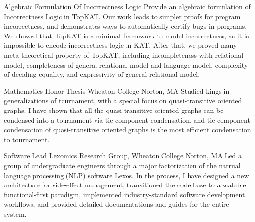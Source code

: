 \documentclass[10pt]{moderncv}        %
\let\oldsection=\section
\renewcommand{\section}{%
  \needspace{\baselineskip}
  \oldsection
}
\begin{document}
{Algebraic Formulation Of Incorrectness Logic}
{}{}{}
{Provide an algebraic formulation of Incorrectness Logic in TopKAT.
Our work leads to simpler proofs for program incorrectness, 
and demonstrates ways to automatically certify bugs in programs.
We showed that TopKAT is a minimal framework to model incorrectness,
as it is impossible to encode incorrectness logic in KAT.
After that, we proved many meta-theoretical property of TopKAT,
including incompleteness with relational model, 
completeness of general relational model and language model, 
complexity of deciding equality, and expressivity of general relational model.
}

{Mathematics Honor Thesis}
{Wheaton College} {Norton, MA}{}
{Studied kings in generalizations of tournament,
with a special focus on quasi-transitive oriented graphs.
I have shown that all the quasi-transitive oriented graphs
can be condensed into a tournament via tie component condensation, 
and tie component condensation of quasi-transitive 
oriented graphs is the most efficient condensation to tournament.
}

{Software Lead}
{Lexomics Research Group, Wheaton College}
{Norton, MA}{}
{
  Led a group of undergraduate engineers through a major factorization of 
  the natrual language processing (NLP) software 
  \href{https://github.com/WheatonCS/Lexos}{Lexos}.
  In the process, 
  I have designed a new architecture for side-effect management,
  transitioned the code base to a scalable functional-first paradigm,
  implemented industry-standard software development workflows,
  and provided detailed documentations and guides for the entire system.
}




\end{document}
